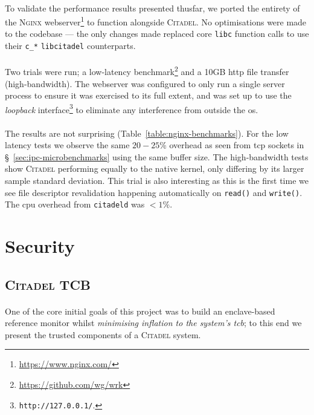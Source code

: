 \paragraph{} To validate the performance results presented thusfar, we ported the entirety of the \textsc{Nginx} webserver\footnote{\url{https://www.nginx.com/}} to function alongside \textsc{Citadel}. No optimisations were made to the codebase --- the only changes made replaced core \texttt{libc} function calls to use their \texttt{c\_*} \texttt{libcitadel} counterparts.

\paragraph{} Two trials were run; a low-latency benchmark\footnote{\url{https://github.com/wg/wrk}} and a 10GB \acrshort{http} file transfer (high-bandwidth). The webserver was configured to only run a single server process to ensure it was exercised to its full extent, and was set up to use the \textit{loopback} interface\footnote{\texttt{http://127.0.0.1/}.} to eliminate any interference from outside the \acrshort{os}. 

\paragraph{} The results are not surprising (Table~\ref{table:nginx-benchmarks}). For the low latency tests we observe the same $20-25$\% overhead as seen from \acrshort{tcp} sockets in §~\ref{sec:ipc-microbenchmarks} using the same buffer size. The high-bandwidth tests show \textsc{Citadel} performing equally to the native kernel, only differing by its larger sample standard deviation. This trial is also interesting as this is the first time we see file descriptor revalidation happening automatically on \texttt{read()} and \texttt{write()}. The \acrshort{cpu} overhead from \texttt{citadeld} was $<1\%$.





\section{Security}

\subsection{\textsc{Citadel} TCB}
\label{sec:citadel-tcb}

\paragraph{} One of the core initial goals of this project was to build an enclave-based reference monitor whilst \textit{minimising inflation to the system's \acrshort{tcb}}; to this end we present the trusted components of a \textsc{Citadel} system.

